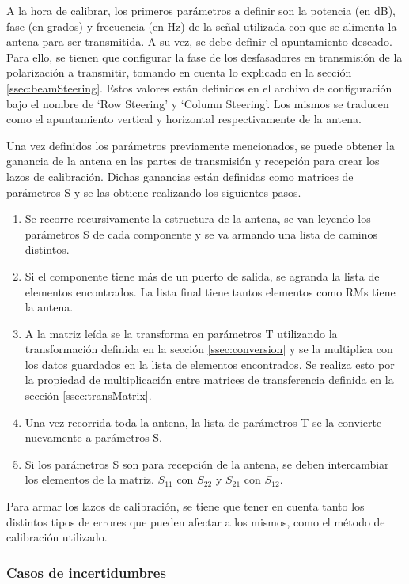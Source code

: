 A la hora de calibrar, los primeros parámetros a definir son la potencia (en dB), fase (en grados) y frecuencia (en Hz) de la 
señal utilizada con que se alimenta la antena para ser transmitida. A su vez, se debe definir el apuntamiento deseado. Para 
ello, se tienen que configurar la fase de los desfasadores en transmisión de la polarización a transmitir, tomando en cuenta lo 
explicado en la sección \ref{ssec:beamSteering}. Estos valores están definidos en el archivo de configuración bajo el nombre 
de \enquote*{Row Steering} y \enquote*{Column Steering}. Los mismos se traducen como el apuntamiento vertical y horizontal 
respectivamente de la antena.

Una vez definidos los parámetros previamente mencionados, se puede obtener la ganancia de la antena en las partes de 
transmisión y recepción para crear los lazos de calibración. Dichas ganancias están definidas como matrices de parámetros
S y se las obtiene realizando los siguientes pasos.

\begin{enumerate}
	\item Se recorre recursivamente la estructura de la antena, se van leyendo los parámetros S de cada componente y se va 
		armando una lista de caminos distintos.
	\item Si el componente tiene más de un puerto de salida, se agranda la lista de elementos encontrados. La lista final tiene 
		tantos elementos como RMs tiene la antena.
	\item A la matriz leída se la transforma en parámetros T utilizando la transformación definida en la sección 
		\ref{ssec:conversion} y se la multiplica con los datos guardados en la lista de elementos encontrados. Se realiza esto 
		por la propiedad de multiplicación entre matrices de transferencia definida en la sección \ref{ssec:transMatrix}.
	\item Una vez recorrida toda la antena, la lista de parámetros T se la convierte nuevamente a parámetros S.
	\item Si los parámetros S son para recepción de la antena, se deben intercambiar los elementos de la matriz. $S_{11}$ con 
		$S_{22}$ y $S_{21}$ con $S_{12}$.
\end{enumerate}


Para armar los lazos de calibración, se tiene que tener en cuenta tanto los distintos tipos de errores que pueden afectar a los
mismos, como el método de calibración utilizado. 

\subsubsection{Casos de incertidumbres}

